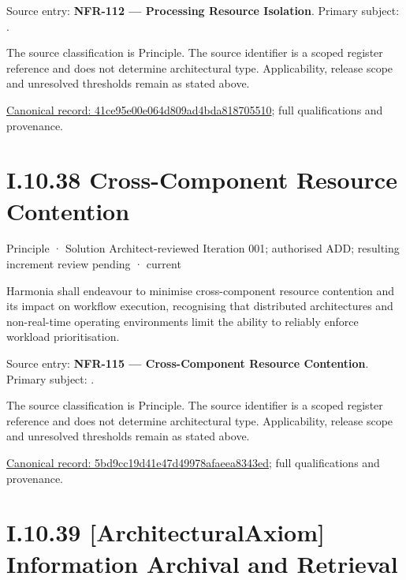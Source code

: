 Source entry: \textbf{NFR-112 — Processing Resource Isolation}. Primary subject: \texttt{}.



The source classification is Principle. The source identifier is a scoped register reference and does not determine architectural type. Applicability, release scope and unresolved thresholds remain as stated above.


{\footnotesize \href{../../../../../../../../continuum/motivation/principle/41ce95e00e064d809ad4bda818705510.md}{Canonical record: 41ce95e00e064d809ad4bda818705510}; full qualifications and provenance.}\par
\section*{I.10.38 Cross-Component Resource Contention}
\label{navigation:I.10.38}

\label{element:5bd9cc19d41e47d49978afaeea8343ed}
{\small Principle · Solution Architect-reviewed Iteration 001; authorised ADD; resulting increment review pending · current}\par

Harmonia shall endeavour to minimise cross-component resource contention and its impact on workflow execution, recognising that distributed architectures and non-real-time operating environments limit the ability to reliably enforce workload prioritisation.



Source entry: \textbf{NFR-115 — Cross-Component Resource Contention}. Primary subject: \texttt{}.



The source classification is Principle. The source identifier is a scoped register reference and does not determine architectural type. Applicability, release scope and unresolved thresholds remain as stated above.


{\footnotesize \href{../../../../../../../../continuum/motivation/principle/5bd9cc19d41e47d49978afaeea8343ed.md}{Canonical record: 5bd9cc19d41e47d49978afaeea8343ed}; full qualifications and provenance.}\par
\section*{I.10.39 [ArchitecturalAxiom] Information Archival and Retrieval}
\label{navigation:I.10.39}

